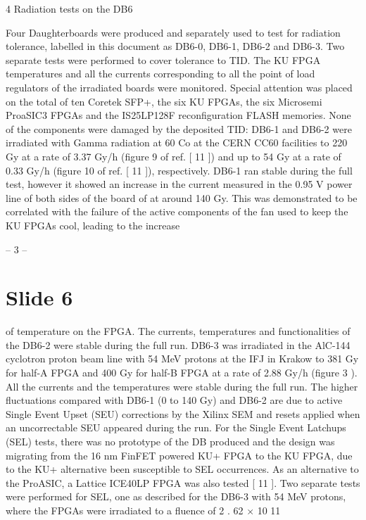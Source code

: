\documentclass{article}
\begin{document}
4 
Radiation tests on the DB6

Four Daughterboards were produced and separately used to test for radiation tolerance, labelled in 
this document as DB6-0, DB6-1, DB6-2 and DB6-3. 
Two separate tests were performed to cover tolerance to TID.   The KU FPGA temperatures 
and all the currents corresponding to all the point of load regulators of the irradiated boards were 
monitored.   Special attention was placed on the total of ten Coretek SFP+, the six KU FPGAs, the 
six Microsemi ProaSIC3 FPGAs and the IS25LP128F reconfiguration FLASH memories.   None 
of the components were damaged by the deposited TID: DB6-1 and DB6-2 were irradiated with 
Gamma radiation at   60 Co at the CERN CC60 facilities to 220 Gy at a rate of 3.37 Gy/h (figure 9 of 
ref. [ 11 ]) and up to 54 Gy at a rate of 0.33 Gy/h (figure 10 of ref. [ 11 ]), respectively.   DB6-1 ran 
stable during the full test, however it showed an increase in the current measured in the 0.95 V power 
line of both sides of the board of at around 140 Gy.   This was demonstrated to be correlated with the 
failure of the active components of the fan used to keep the KU FPGAs cool, leading to the increase

-- 3 --

\section*{Slide 6}

of temperature on the FPGA.   The currents, temperatures and functionalities of the DB6-2 were 
stable during the full run.   DB6-3 was irradiated in the AlC-144 cyclotron proton beam line with 
54 MeV protons at the IFJ in Krakow to 381 Gy for half-A FPGA and 400 Gy for half-B FPGA at a 
rate of 2.88 Gy/h (figure  3 ).   All the currents and the temperatures were stable during the full run. 
The higher fluctuations compared with DB6-1 (0 to 140 Gy) and DB6-2 are due to active Single 
Event Upset (SEU) corrections by the Xilinx SEM and resets applied when an uncorrectable SEU 
appeared during the run. 
For the Single Event Latchups (SEL) tests, there was no prototype of the DB produced and the 
design was migrating from the 16 nm FinFET powered KU+ FPGA to the KU FPGA, due to the 
KU+ alternative been susceptible to SEL occurrences.   As an alternative to the ProASIC, a Lattice 
ICE40LP FPGA was also tested [ 11 ].   Two separate tests were performed for SEL, one as described 
for the DB6-3 with 54 MeV protons, where the FPGAs were irradiated to a fluence of 2 . 62  $\times$  10 11
\end{document}

